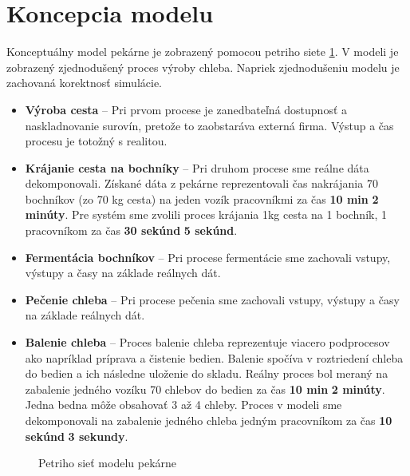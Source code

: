 \documentclass[a4paper, 10pt]{article}
\begin{document}
    \section {Koncepcia modelu}
    Konceptuálny model pekárne je zobrazený pomocou petriho siete \ref{fig:petri}.
    V modeli je zobrazený zjednodušený proces výroby chleba. Napriek zjednodušeniu modelu je zachovaná korektnosť simulácie.
    \begin{itemize}
        \item \textbf{Výroba cesta} -- Pri prvom procese je zanedbateľná dostupnosť a naskladnovanie surovín,
        pretože to zaobstaráva externá firma. Výstup a čas procesu je totožný s realitou.

        \item \textbf{Krájanie cesta na bochníky} -- Pri druhom procese sme reálne dáta dekomponovali. Získané
        dáta z pekárne reprezentovali čas nakrájania 70 bochníkov (zo 70 kg cesta) na jeden vozík pracovníkmi za čas \textbf{10 min} \textpm \textbf{ 2 minúty}.
        Pre systém sme zvolili proces krájania 1kg cesta na 1 bochník, 1 pracovníkom za čas \textbf{30 sekúnd} \textpm \textbf{ 5 sekúnd}.

        \item \textbf{Fermentácia bochníkov} -- Pri procese fermentácie sme zachovali vstupy, výstupy a časy na základe reálnych dát.

        \item \textbf{Pečenie chleba} -- Pri procese pečenia sme zachovali vstupy, výstupy a časy na základe reálnych dát.

        \item \textbf{Balenie chleba} -- Proces balenie chleba reprezentuje viacero podprocesov ako napríklad príprava a čistenie bedien.
        Balenie spočíva v roztriedení chleba do bedien a ich následne uloženie do skladu. Reálny proces bol meraný na
        zabalenie jedného vozíku 70 chlebov do bedien za čas \textbf{10 min} \textpm \textbf{ 2 minúty}. Jedna bedna môže obsahovať 3 až 4 chleby. Proces v modeli sme dekomponovali
        na zabalenie jedného chleba jedným pracovníkom za čas \textbf{10 sekúnd} \textpm \textbf{ 3 sekundy}.
    \end{itemize}

    \begin{figure}[h]
        \caption{\label{fig:petri}Petriho sieť modelu pekárne}
    \end{figure}
\end{document}
